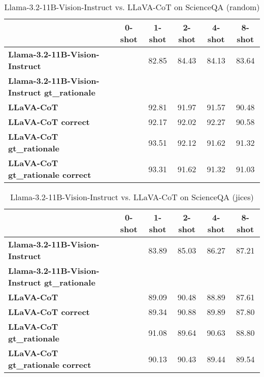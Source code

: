 \begin{table}
\caption{Llama-3.2-11B-Vision-Instruct vs. LLaVA-CoT on ScienceQA (random)}
\label{tab:Llama-3.2-11B-Vision-Instruct_ScienceQA_TRAIN_random}
\begin{tabular}{lccccc}
\toprule
 & 0-shot & 1-shot & 2-shot & 4-shot & 8-shot \\
\midrule
\textbf{Llama-3.2-11B-Vision-Instruct} &  & 82.85 & 84.43 & 84.13 & 83.64 \\
\textbf{Llama-3.2-11B-Vision-Instruct gt\_rationale} &  &  &  &  &  \\
\textbf{LLaVA-CoT} &  & 92.81 & 91.97 & 91.57 & 90.48 \\
\textbf{LLaVA-CoT correct} &  & 92.17 & 92.02 & 92.27 & 90.58 \\
\textbf{LLaVA-CoT gt\_rationale} &  & 93.51 & 92.12 & 91.62 & 91.32 \\
\textbf{LLaVA-CoT gt\_rationale correct} &  & 93.31 & 91.62 & 91.32 & 91.03 \\
\bottomrule
\end{tabular}
\end{table}


\begin{table}
\caption{Llama-3.2-11B-Vision-Instruct vs. LLaVA-CoT on ScienceQA (jices)}
\label{tab:Llama-3.2-11B-Vision-Instruct_ScienceQA_TRAIN_jices}
\begin{tabular}{lccccc}
\toprule
 & 0-shot & 1-shot & 2-shot & 4-shot & 8-shot \\
\midrule
\textbf{Llama-3.2-11B-Vision-Instruct} &  & 83.89 & 85.03 & 86.27 & 87.21 \\
\textbf{Llama-3.2-11B-Vision-Instruct gt\_rationale} &  &  &  &  &  \\
\textbf{LLaVA-CoT} &  & 89.09 & 90.48 & 88.89 & 87.61 \\
\textbf{LLaVA-CoT correct} &  & 89.34 & 90.88 & 89.89 & 87.80 \\
\textbf{LLaVA-CoT gt\_rationale} &  & 91.08 & 89.64 & 90.63 & 88.80 \\
\textbf{LLaVA-CoT gt\_rationale correct} &  & 90.13 & 90.43 & 89.44 & 89.54 \\
\bottomrule
\end{tabular}
\end{table}



